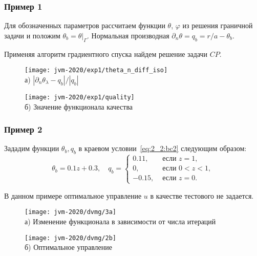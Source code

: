 \begin{frame}
    \frametitle{Пример 1}
    Для обозначенных параметров рассчитаем функции $\theta$, $\varphi$ из решения граничной задачи
    и положим $\theta_b = \theta|_\Gamma$.
    Нормальная производная $\partial_n \theta = q_b = r / a - \theta_b$.

    Применяя алгоритм градиентного спуска найдем решение задачи $CP$.
    \begin{figure}[h!t]
        \begin{minipage}[b][][b]{0.49\linewidth}
            \centering
            \texttt{[image: jvm-2020/exp1/theta\_n\_diff\_iso]}
            \\ а) $|\partial_n\theta_\lambda-q_b|/|q_b|$
        \end{minipage}
        \hfill
        \begin{minipage}[b][][b]{0.49\linewidth}
            \centering
            \texttt{[image: jvm-2020/exp1/quality]}
            \\ б) Значение функционала качества
        \end{minipage}
        \label{fig:4_4:0}
    \end{figure}
\end{frame}

\begin{frame}
    \frametitle{Пример 2}
    Зададим функции $\theta_{b}, q_{b}$ в краевом условии~\eqref{eq:2_2:bc2}
    следующим образом:
    \[
        \theta_{b}=0.1 z+0.3, \quad q_{b}=
        \begin{cases}
            0.11, & \text { если } z=1, \\
            0, & \text { если } 0<z<1, \\
            -0.15, & \text { если } z=0.
        \end{cases}
    \]

    В данном примере оптимальное управление $u$ в качестве тестового не задается.

    \begin{figure}[h!t]
        \begin{minipage}[b][][b]{0.49\linewidth}
            \centering
            \texttt{[image: jvm-2020/dvmg/3a]}
            \\ а) Изменение функционала в зависимости от числа итераций
        \end{minipage}
        \hfill
        \begin{minipage}[b][][b]{0.49\linewidth}
            \centering
            \texttt{[image: jvm-2020/dvmg/2b]}
            \\ б) Оптимальное управление
        \end{minipage}
        \label{fig:4_4:3}
    \end{figure}

\end{frame}

